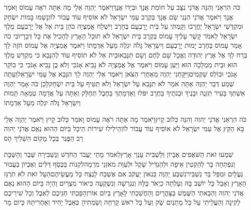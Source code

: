 \documentclass[../main/main.tex]{subfiles}
\begin{document}
\begin{multicols}{\ncols}
כֹּה הִרְאַנִי וְהִנֵּה אֲדֹנַי נִצָּב עַל חוֹמַת אֲנָךְ וּבְיָדוֹ אֲנָךְ\PreVerseSpace{}וַיֹּאמֶר יַהְוֶה אֵלַי מָה אַתָּה רֹאֶה עָמוֹס וָאֹמַר אֲנָךְ וַיֹּאמֶר אֲדֹנַי הִנְנִי שָׂם אֲנָךְ בְּקֶרֶב עַמִּי יִשְׂרָאֵל לֹא אוֹסִיף עוֹד עֲבוֹר לוֹ\PreVerseSpace{}וְנָשַׁמּוּ בָּמוֹת יִשְׂחָק וּמִקְדְּשֵׁי יִשְׂרָאֵל יֶחֱרָבוּ וְקַמְתִּי עַל בֵּית יָרָבְעָם בֶּחָרֶב \ClosedSection{}וַיִּשְׁלַח אֲמַצְיָה כֹּהֵן בֵּית אֵל אֶל יָרָבְעָם מֶלֶךְ יִשְׂרָאֵל לֵאמֹר קָשַׁר עָלֶיךָ עָמוֹס בְּקֶרֶב בֵּית יִשְׂרָאֵל לֹא תוּכַל הָאָרֶץ לְהָכִיל אֶת כָּל דְּבָרָיו\PreVerseSpace{}כִּי כֹה אָמַר עָמוֹס בַּחֶרֶב יָמוּת יָרָבְעָם וְיִשְׂרָאֵל גָּלֹה יִגְלֶה מֵעַל אַדְמָתוֹ \ClosedSection{}וַיֹּאמֶר אֲמַצְיָה אֶל עָמוֹס חֹזֶה לֵךְ בְּרַח לְךָ אֶל אֶרֶץ יְהוּדָה וֶאֱכָל שָׁם לֶחֶם וְשָׁם תִּנָּבֵא\PreVerseSpace{}וּבֵית אֵל לֹא תוֹסִיף עוֹד לְהִנָּבֵא כִּי מִקְדַּשׁ מֶלֶךְ הוּא וּבֵית מַמְלָכָה הוּא \ClosedSection{}וַיַּעַן עָמוֹס וַיֹּאמֶר אֶל אֲמַצְיָה לֹא נָבִיא אָנֹכִי וְלֹא בֶן נָבִיא אָנֹכִי כִּי בוֹקֵר אָנֹכִי וּבוֹלֵס שִׁקְמִים\PreVerseSpace{}וַיִּקָּחֵנִי יַהְוֶה מֵאַחֲרֵי הַצֹּאן וַיֹּאמֶר אֵלַי יַהְוֶה לֵךְ הִנָּבֵא אֶל עַמִּי יִשְׂרָאֵל\PreVerseSpace{}וְעַתָּה שְׁמַע דְּבַר יַהְוֶה אַתָּה אֹמֵר לֹא תִנָּבֵא עַל יִשְׂרָאֵל וְלֹא תַטִּיף עַל בֵּית יִשְׂחָק\PreVerseSpace{}לָכֵן כֹּה אָמַר יַהְוֶה אִשְׁתְּךָ בָּעִיר תִּזְנֶה וּבָנֶיךָ וּבְנֹתֶיךָ בַּחֶרֶב יִפֹּלוּ וְאַדְמָתְךָ בַּחֶבֶל תְּחֻלָּק וְאַתָּה עַל אֲדָמָה טְמֵאָה תָּמוּת וְיִשְׂרָאֵל גָּלֹה יִגְלֶה מֵעַל אַדְמָתוֹ\OpenSection{}\par
{}כֹּה הִרְאַנִי אֲדֹנַי יְהוִה וְהִנֵּה כְּלוּב קָיִץ\PreVerseSpace{}וַיֹּאמֶר מָה אַתָּה רֹאֶה עָמוֹס וָאֹמַר כְּלוּב קָיִץ וַיֹּאמֶר יַהְוֶה אֵלַי בָּא הַקֵּץ אֶל עַמִּי יִשְׂרָאֵל לֹא אוֹסִיף עוֹד עֲבוֹר לוֹ\PreVerseSpace{}וְהֵילִילוּ שִׁירוֹת הֵיכָל בַּיּוֹם הַהוּא נְאֻם אֲדֹנַי יְהוִה רַב הַפֶּגֶר בְּכָל מָקוֹם הִשְׁלִיךְ הָס\OpenSection{}\par
{}שִׁמְעוּ זֹאת הַשֹּׁאֲפִים אֶבְיוֹן וְלַשְׁבִּית עַנְוֵי אָרֶץ\PreVerseSpace{}לֵאמֹר מָתַי יַעֲבֹר הַחֹדֶשׁ וְנַשְׁבִּירָה שֶּׁבֶר וְהַשַּׁבָּת וְנִפְתְּחָה בָּר לְהַקְטִין אֵיפָה וּלְהַגְדִּיל שֶׁקֶל וּלְעַוֵּת מֹאזְנֵי מִרְמָה\PreVerseSpace{}לִקְנוֹת בַּכֶּסֶף דַּלִּים וְאֶבְיוֹן בַּעֲבוּר נַעֲלָיִם וּמַפַּל בַּר נַשְׁבִּיר\PreVerseSpace{}נִשְׁבַּע יַהְוֶה בִּגְאוֹן יַעֲקֹב אִם אֶשְׁכַּח לָנֶצַח כָּל מַעֲשֵׂיהֶם\PreVerseSpace{}הַעַל זֹאת לֹא תִרְגַּז הָאָרֶץ וְאָבַל כָּל יוֹשֵׁב בָּהּ וְעָלְתָה כַיְאֹר\SubEnd{} כֻּלָּהּ וְנִגְרְשָׁה וְנִשְׁקְעָה\SubEnd{} כִּיאוֹר מִצְרָיִם \ClosedSection{}וְהָיָה בַּיּוֹם הַהוּא נְאֻם אֲדֹנַי יְהוִה וְהֵבֵאתִי הַשֶּׁמֶשׁ בַּצָּהֳרָיִם וְהַחֲשַׁכְתִּי לָאָרֶץ בְּיוֹם אוֹר\PreVerseSpace{}וְהָפַכְתִּי חַגֵּיכֶם לְאֵבֶל וְכָל שִׁירֵיכֶם לְקִינָה וְהַעֲלֵיתִי עַל כָּל מָתְנַיִם שָׂק וְעַל כָּל רֹאשׁ קָרְחָה וְשַׂמְתִּיהָ כְּאֵבֶל יָחִיד וְאַחֲרִיתָהּ כְּיוֹם מָר\OpenSection{}\par

\end{multicols}
\end{document}
